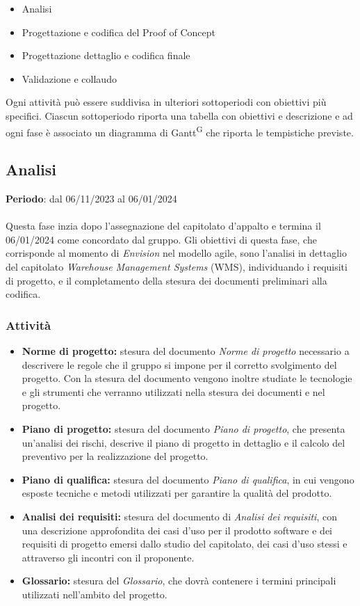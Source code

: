 \begin{itemize}
    \item Analisi
    \item Progettazione e codifica del Proof of Concept
    \item Progettazione dettaglio e codifica finale
    \item Validazione e collaudo
\end{itemize}

Ogni attività può essere suddivisa in ulteriori sottoperiodi con obiettivi più specifici. Ciascun sottoperiodo riporta una tabella con obiettivi e descrizione e ad ogni fase è associato un diagramma di Gantt\textsuperscript{G} che riporta le tempistiche previste.

\subsection{Analisi}\label{sec:pianificazione:analisi}

\textbf{Periodo}: dal 06/11/2023 al 06/01/2024\\\\
Questa fase inzia dopo l'assegnazione del capitolato d'appalto e termina il 06/01/2024 come concordato dal gruppo. Gli obiettivi di questa fase, che corrisponde al momento di \textit{Envision} nel modello agile, sono l'analisi in dettaglio del capitolato \textit{Warehouse Management Systems} (WMS), individuando i requisiti di progetto, e il completamento della stesura dei documenti preliminari alla codifica.

\subsubsection{Attività}\label{sec:pianificazione:analisi:attivita}
\begin{itemize}
    \item \textbf{Norme di progetto:} stesura del documento \textit{Norme di progetto} necessario a descrivere le regole che il gruppo si impone per il corretto svolgimento del progetto. Con la stesura del documento vengono inoltre studiate le tecnologie e gli strumenti che verranno utilizzati nella stesura dei documenti e nel progetto.
    \item \textbf{Piano di progetto:} stesura del documento \textit{Piano di progetto}, che presenta un'analisi dei rischi, descrive il piano di progetto in dettaglio e il calcolo del preventivo per la realizzazione del progetto.
    \item \textbf{Piano di qualifica:} stesura del documento \textit{Piano di qualifica}, in cui vengono esposte tecniche e metodi utilizzati per garantire la qualità del prodotto.
    \item \textbf{Analisi dei requisiti:} stesura del documento di \textit{Analisi dei requisiti}, con una descrizione approfondita dei casi d'uso per il prodotto software e dei requisiti di progetto emersi dallo studio del capitolato, dei casi d'uso stessi e attraverso gli incontri con il proponente.
    \item \textbf{Glossario:} stesura del \textit{Glossario}, che dovrà contenere i termini principali utilizzati nell'ambito del progetto.
\end{itemize}


